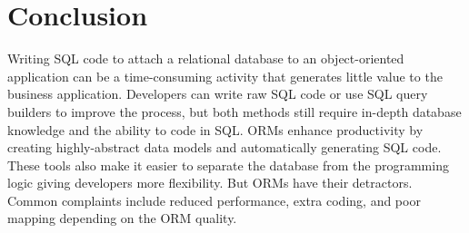 \documentclass[10pt,a4paper,twoside]{article}
\begin{document}
\section{Conclusion}
Writing SQL code to attach a relational database to an object-oriented application can be a time-consuming activity that generates little value to the business application. Developers can write raw SQL code or use SQL query builders to improve the process, but both methods still require in-depth database knowledge and the ability to code in SQL. ORMs enhance productivity by creating highly-abstract data models and automatically generating SQL code. These tools also make it easier to separate the database from the programming logic giving developers more flexibility. But ORMs have their detractors. Common complaints include reduced performance, extra coding, and poor mapping depending on the ORM quality.
\end{document}
